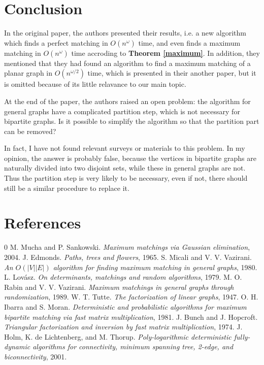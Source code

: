 \documentclass[a4paper]{article}
\begin{document}
	\section{Conclusion}

		\hspace{2em}In the original paper, the authors presented their results, i.e. a new algorithm which finds a perfect matching in $O(n^\omega)$ time, and even finds a maximum matching in $O(n^\omega)$ time accroding to {\bfseries Theorem \ref{maximum}}. In addition, they mentioned that they had found an algorithm to find a maximum matching of a planar graph in $O(n^{\omega / 2})$ time, which is presented in their another paper, but it is omitted because of its little relavance to our main topic.

		At the end of the paper, the authors raised an open problem: the algorithm for general graphs have a complicated partition step, which is not necessary for bipartite graphs. Is it possible to simplify the algorithm so that the partition part can be removed?
		
		In fact, I have not found relevant surveys or materials to this problem. In my opinion, the answer is probably false, because the vertices in bipartite graphs are naturally divided into two disjoint sets, while these in general graphs are not. Thus the partition step is very likely to be necessary, even if not, there should still be a similar procedure to replace it.

	\section{References}

		\begin{thebibliography} {0}
			 M. Mucha and P. Sankowski. \emph{Maximum matchings via Gaussian elimination}, 2004.
			 J. Edmonds. \emph{Paths, trees and flowers}, 1965.
			 S. Micali and V. V. Vazirani. \emph{An $O(|V||E|)$ algorithm for finding maximum matching in general graphs}, 1980.
			 L. Lov\'asz. \emph{On determinants, matchings and random algorithms}, 1979.
			 M. O. Rabin and V. V. Vazirani. \emph{Maximum matchings in general graphs through randomization}, 1989.
			 W. T. Tutte. \emph{The factorization of linear graphs}, 1947.
			 O. H. Ibarra and S. Moran. \emph{Deterministic and probabilistic algorithms for maximum bipartite matching via fast matrix multiplication}, 1981.
			 J. Bunch and J. Hopcroft. \emph{Triangular factorization and inversion by fast matrix multiplication}, 1974.
			 J. Holm, K. de Lichtenberg, and M. Thorup. \emph{Poly-logarithmic deterministic fully-dynamic algorithms for connectivity, minimum spanning tree, 2-edge, and biconnectivity}, 2001.
		\end{thebibliography}
\end{document}
